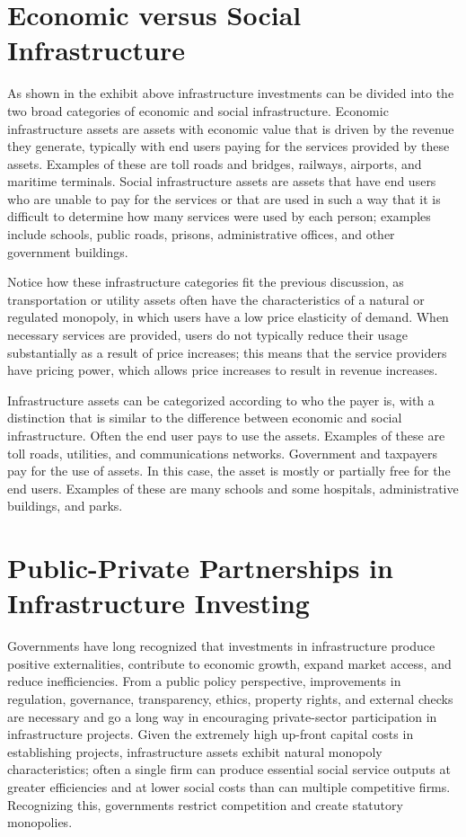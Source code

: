 \documentclass[11pt]{article}
\begin{document}
\section*{Economic versus Social Infrastructure}
As shown in the exhibit above infrastructure investments can be divided into the two broad categories of economic and social infrastructure. Economic infrastructure assets are assets with economic value that is driven by the revenue they generate, typically with end users paying for the services provided by these assets. Examples of these are toll roads and bridges, railways, airports, and maritime terminals. Social infrastructure assets are assets that have end users who are unable to pay for the services or that are used in such a way that it is difficult to determine how many services were used by each person; examples include schools, public roads, prisons, administrative offices, and other government buildings.

Notice how these infrastructure categories fit the previous discussion, as transportation or utility assets often have the characteristics of a natural or regulated monopoly, in which users have a low price elasticity of demand. When necessary services are provided, users do not typically reduce their usage substantially as a result of price increases; this means that the service providers have pricing power, which allows price increases to result in revenue increases.

Infrastructure assets can be categorized according to who the payer is, with a distinction that is similar to the difference between economic and social infrastructure. Often the end user pays to use the assets. Examples of these are toll roads, utilities, and communications networks. Government and taxpayers pay for the use of assets. In this case, the asset is mostly or partially free for the end users. Examples of these are many schools and some hospitals, administrative buildings, and parks.

\section*{Public-Private Partnerships in Infrastructure Investing}
Governments have long recognized that investments in infrastructure produce positive externalities, contribute to economic growth, expand market access, and reduce inefficiencies. From a public policy perspective, improvements in regulation, governance, transparency, ethics, property rights, and external checks are necessary and go a long way in encouraging private-sector participation in infrastructure projects. Given the extremely high up-front capital costs in establishing projects, infrastructure assets exhibit natural monopoly characteristics; often a single firm can produce essential social service outputs at greater efficiencies and at lower social costs than can multiple competitive firms. Recognizing this, governments restrict competition and create statutory monopolies.
\end{document}
